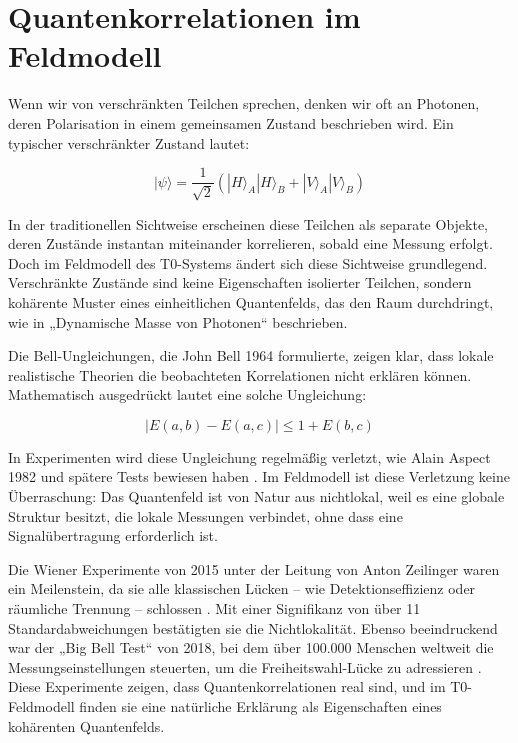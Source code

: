 \documentclass[a4paper,12pt]{article}
\theoremstyle{definition}
\theoremstyle{remark}
\begin{document}
	\section{Quantenkorrelationen im Feldmodell}
	
	Wenn wir von verschränkten Teilchen sprechen, denken wir oft an Photonen, deren Polarisation in einem gemeinsamen Zustand beschrieben wird. Ein typischer verschränkter Zustand lautet:
	
	\begin{equation}
		|\psi\rangle = \frac{1}{\sqrt{2}} (|H\rangle_A |H\rangle_B + |V\rangle_A |V\rangle_B)
	\end{equation}
	
	In der traditionellen Sichtweise erscheinen diese Teilchen als separate Objekte, deren Zustände instantan miteinander korrelieren, sobald eine Messung erfolgt. Doch im Feldmodell des T0-Systems ändert sich diese Sichtweise grundlegend. Verschränkte Zustände sind keine Eigenschaften isolierter Teilchen, sondern kohärente Muster eines einheitlichen Quantenfelds, das den Raum durchdringt, wie in „Dynamische Masse von Photonen“ \cite{pascher_photons_2025} beschrieben.
	
	Die Bell-Ungleichungen, die John Bell 1964 formulierte, zeigen klar, dass lokale realistische Theorien die beobachteten Korrelationen nicht erklären können. Mathematisch ausgedrückt lautet eine solche Ungleichung:
	
	\begin{equation}
		|E(a,b) - E(a,c)| \leq 1 + E(b,c)
	\end{equation}
	
	In Experimenten wird diese Ungleichung regelmäßig verletzt, wie Alain Aspect 1982 und spätere Tests bewiesen haben \cite{Aspect1982}. Im Feldmodell ist diese Verletzung keine Überraschung: Das Quantenfeld ist von Natur aus nichtlokal, weil es eine globale Struktur besitzt, die lokale Messungen verbindet, ohne dass eine Signalübertragung erforderlich ist.
	
	Die Wiener Experimente von 2015 unter der Leitung von Anton Zeilinger waren ein Meilenstein, da sie alle klassischen Lücken – wie Detektionseffizienz oder räumliche Trennung – schlossen \cite{Giustina2015}. Mit einer Signifikanz von über 11 Standardabweichungen bestätigten sie die Nichtlokalität. Ebenso beeindruckend war der „Big Bell Test“ von 2018, bei dem über 100.000 Menschen weltweit die Messungseinstellungen steuerten, um die Freiheitswahl-Lücke zu adressieren \cite{BigBellTest2018}. Diese Experimente zeigen, dass Quantenkorrelationen real sind, und im T0-Feldmodell finden sie eine natürliche Erklärung als Eigenschaften eines kohärenten Quantenfelds.
	
\end{document}
